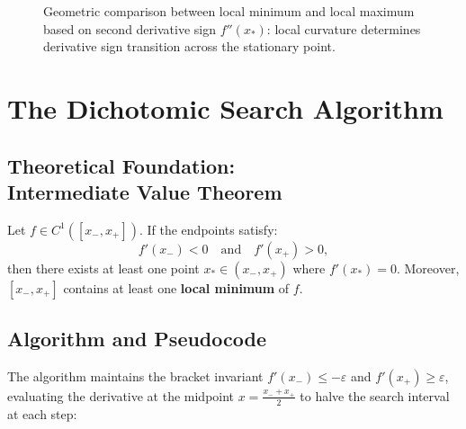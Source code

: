 \begin{figure}[H]
\caption{Geometric comparison between local minimum and local maximum based on second derivative sign $f''(x_*)$: local curvature determines derivative sign transition across the stationary point.}
\label{fig:first-second-order-conditions-en}
\end{figure}

\FloatBarrier
\section{The Dichotomic Search Algorithm}
\label{sec:univariate-dichotomic-search-en}

\subsection[Theoretical Foundation: Intermediate Value Theorem]{Theoretical Foundation:\\Intermediate Value Theorem}
\begin{theorem}
Let $f \in C^1([x_-, x_+])$. If the endpoints satisfy:
\begin{equation}
    f'(x_-) < 0 \quad \text{and} \quad f'(x_+) > 0,
\end{equation}
then there exists at least one point $x_* \in (x_-, x_+)$ where $f'(x_*) = 0$. Moreover, $[x_-, x_+]$ contains at least one \textbf{local minimum} of $f$.
\end{theorem}

\subsection{Algorithm and Pseudocode}
The algorithm maintains the bracket invariant $f'(x_-) \le -\varepsilon$ and $f'(x_+) \ge \varepsilon$, evaluating the derivative at the midpoint $x = \frac{x_- + x_+}{2}$ to halve the search interval at each step:

